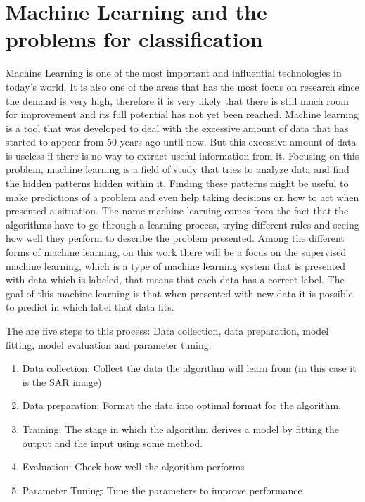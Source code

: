 \section{Machine Learning and the problems for classification}
\label{sec:machine_learning_problems}
Machine Learning is one of the most important and influential technologies in today's world. It is also one of the areas that has the most focus on research since the demand is very high, therefore it is very likely that there is still much room for improvement and its full potential has not yet been reached. \newline
Machine learning is a tool that was developed to deal with the excessive amount of data that has started to appear from 50 years ago until now. But this excessive amount of data is useless if there is no way to extract useful information from it. Focusing on this problem, machine learning is a field of study that tries to analyze data and find the hidden patterns hidden within it. Finding these patterns might be useful to make predictions of a problem and even help taking decisions on how to act when presented a situation.\newline
The name machine learning comes from the fact that the algorithms have to go through a learning process, trying different rules and seeing how well they perform to describe the problem presented. Among the different forms of machine learning, on this work there will be a focus on the supervised machine learning, which is a type of machine learning system that is presented with data which is labeled, that means that each data has a correct label. The goal of this machine learning is that when presented with new data it is possible to predict in which label that data fits. \newline

The are five steps to this process: Data collection, data preparation, model fitting, model evaluation and parameter tuning.
\begin{enumerate}
    \item Data collection: Collect the data the algorithm will learn from (in this case it is the SAR image)
    \item Data preparation: Format the data into optimal format for the algorithm.
    \item Training: The stage in which the algorithm derives a model by fitting the output and the input using some method.
    \item Evaluation: Check how well the algorithm performs
    \item Parameter Tuning: Tune the parameters to improve performance
\end{enumerate}{}

